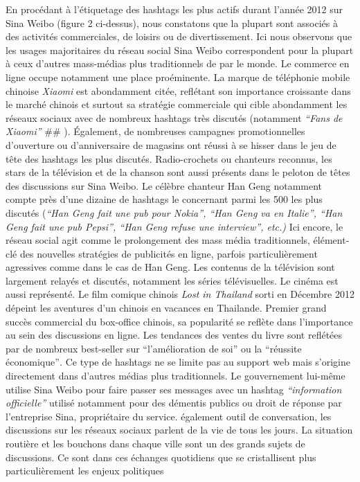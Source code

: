 En procédant à l{\textquoteright}étiquetage des hashtags les plus actifs durant l{\textquoteright}année 2012 sur Sina Weibo (figure 2 ci-dessus), nous constatons que la plupart sont associés à des activités commerciales, de loisirs ou de divertissement. Ici nous observons que les usages majoritaires du réseau social Sina Weibo correspondent pour la plupart à ceux d{\textquoteright}autres mass-médias plus traditionnels de par le monde. Le commerce en ligne occupe notamment une place proéminente. La marque de téléphonie mobile chinoise \textit{Xiaomi} est abondamment citée, reflétant son importance croissante dans le marché chinois et surtout sa stratégie commerciale qui cible abondamment les réseaux sociaux avec de nombreux hashtags très discutés (notamment \textit{{\textquotedblleft}Fans de Xiaomi{\textquotedblright} } \#\# ). Également, de nombreuses campagnes promotionnelles d{\textquoteright}ouverture ou d{\textquoteright}anniversaire de magasins ont réussi à se hisser dans le jeu de t\^ete des hashtags les plus discutés. Radio-crochets ou chanteurs reconnus, les stars de la télévision et de la chanson sont aussi présents dans le peloton de t\^etes des discussions sur Sina Weibo. Le célèbre chanteur Han Geng notamment compte près d{\textquoteright}une dizaine de hashtags le concernant parmi les 500 les plus discutés (\textit{{\textquotedblleft}Han Geng fait une pub pour Nokia{\textquotedblright}, {\textquotedblleft}Han Geng va en Italie{\textquotedblright}, {\textquotedblleft}Han Geng fait une pub Pepsi{\textquotedblright}, {\textquotedblleft}Han Geng refuse une interview{\textquotedblright}, etc.)} Ici encore, le réseau social agit comme le prolongement des mass média traditionnels, élément-clé des nouvelles stratégies de publicités en ligne, parfois particulièrement agressives comme dans le cas de Han Geng. Les contenus de la télévision sont largement relayés et discutés, notamment les séries télévisuelles. Le cinéma est aussi représenté. Le film comique chinois \textit{Lost in Thailand }sorti en Décembre 2012 dépeint les aventures d{\textquoteright}un chinois en vacances en Thailande. Premier grand succès commercial du box-office chinois, sa popularité se reflète dans l{\textquoteright}importance au sein des discussions en ligne. Les tendances des ventes du livre sont reflétées par de nombreux best-seller sur {\textquotedblleft}l{\textquoteright}amélioration de soi{\textquotedblright} ou la {\textquotedblleft}réussite économique{\textquotedblright}\textit{. }Ce type de hashtags ne se limite pas au support web mais s{\textquoteright}origine directement dans d{\textquoteright}autres médias plus traditionnels. Le gouvernement lui-m\^eme utilise Sina Weibo pour faire passer ses messages avec un hashtag \textit{{\textquotedblleft}information officielle{\textquotedblright} }utilisé notamment pour des démentis publics ou droit de réponse par l{\textquoteright}entreprise Sina, propriétaire du service. également outil de conversation, les discussions sur les réseaux sociaux parlent de la vie de tous les jours. La situation routière et les bouchons dans chaque ville sont un des grands sujets de discussions. Ce sont dans ces échanges quotidiens que se cristallisent plus particulièrement les enjeux politiques 